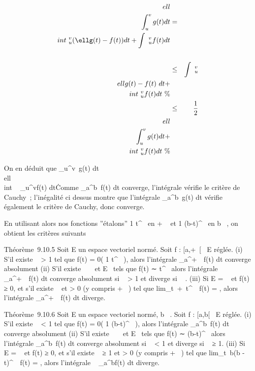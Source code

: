 \documentclass[]{article}
\begin{document}
\begin{align*}
\\ell\\\int
 _u^vg(t) dt& =&
\\int ~
_u^v(\ellg(t) - f(t)) dt +\int ~
_u^vf(t) dt\\%
\\ & \leq& \int ~
_u^v\\ellg(t) -
f(t)\ dt
+\\int ~
_u^vf(t) dt\ \%&
\\ & \leq& 1 \over 2
\\ell\\\int
 _u^vg(t) dt
+\\int ~
_u^vf(t) dt\ \%&
\\ \end{align*}

On en déduit que \int  _u^v~g(t)
dt  \over
\\ell\
\\int ~
_u^vf(t) dt\. Comme
\int  _a^b~f(t) dt converge,
l'intégrale vérifie le critère de Cauchy~; l'inégalité ci dessus montre
que l'intégrale \int  _a^b~g(t) dt
vérifie également le critère de Cauchy, donc converge.

En utilisant alors nos fonctions ''étalons''  1 \over
t^\alpha~ en + \infty~ et  1 \over
(b-t)^\alpha~ en b \in {}~, on obtient les critères suivants

Théorème~9.10.5 Soit E un espace vectoriel normé. Soit f : {[}a,+\infty~{[}\rightarrow~ E
réglée. (i) S'il existe \alpha~ \textgreater{} 1 tel que f(t) = 0( 1
\over t^\alpha~ ), alors l'intégrale
\int  _a^+\infty~~f(t) dt converge
absolument (ii) S'il existe \alpha~ \in {}~ et \ell \in E
\diagdown\0\ tels que f(t) ∼ \ell
\over t^\alpha~ alors l'intégrale
\int  _a^+\infty~~f(t) dt converge
absolument si \alpha~ \textgreater{} 1 et diverge si \alpha~ . (iii) Si E = ~ et
f(t) ≥ 0, et s'il existe \alpha~ \leq 1 et \ell \textgreater{} 0 (y compris + \infty~) tel
que lim_t\rightarrow~+\infty~t^\alpha~~f(t) = \ell,
alors l'intégrale \int  _a^+\infty~~f(t)
dt diverge.

Théorème~9.10.6 Soit E un espace vectoriel normé, b \in {}~. Soit f :
{[}a,b{[}\rightarrow~ E réglée. (i) S'il existe \alpha~ \textless{} 1 tel que f(t) = 0(
1 \over (b-t)^\alpha~ ), alors l'intégrale
\int  _a^b~f(t) dt converge
absolument (ii) S'il existe \alpha~ \in {}~ et \ell \in E
\diagdown\0\ tels que f(t) ∼ \ell
\over (b-t)^\alpha~ alors l'intégrale
\int  _a^b~f(t) dt converge
absolument si \alpha~ \textless{} 1 et diverge si \alpha~ ≥ 1. (iii) Si E = ~ et
f(t) ≥ 0, et s'il existe \alpha~ ≥ 1 et \ell \textgreater{} 0 (y compris + \infty~) tel
que lim_t\rightarrow~b(b - t)^\alpha~~f(t) =
\ell, alors l'intégrale \int ~
_a^bf(t) dt diverge.
\end{document}
